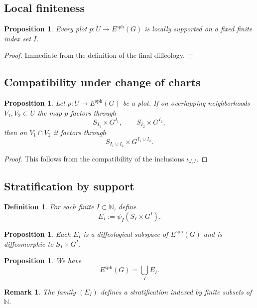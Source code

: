 \documentclass[11pt]{amsart}
\newtheorem{proposition}[theorem]{Proposition}
\newtheorem{definition}[theorem]{Definition}
\newtheorem{remark}[theorem]{Remark}
\begin{document}
\subsection{Local finiteness}

\begin{proposition}
Every plot $p : U \to E^{\mathrm{sph}}(G)$ is locally supported on a fixed finite index set $I$.
\end{proposition}

\begin{proof}
Immediate from the definition of the final diffeology.
\end{proof}

\subsection{Compatibility under change of charts}

\begin{proposition}
Let $p : U \to E^{\mathrm{sph}}(G)$ be a plot. If on overlapping neighborhoods $V_1, V_2 \subset U$ the map $p$ factors through
\[
S_{I_1} \times G^{I_1}, \qquad S_{I_2} \times G^{I_2},
\]
then on $V_1 \cap V_2$ it factors through
\[
S_{I_1 \cup I_2} \times G^{I_1 \cup I_2}.
\]
\end{proposition}

\begin{proof}
This follows from the compatibility of the inclusions $\iota_{J,I}$.
\end{proof}

\subsection{Stratification by support}

\begin{definition}
For each finite $I \subset \mathbb{N}$, define
\[
E_I := \psi_I(S_I \times G^I).
\]
\end{definition}

\begin{proposition}
Each $E_I$ is a diffeological subspace of $E^{\mathrm{sph}}(G)$ and is diffeomorphic to $S_I \times G^I$.
\end{proposition}

\begin{proposition}
We have
\[
E^{\mathrm{sph}}(G) = \bigcup_{I} E_I.
\]
\end{proposition}

\begin{remark}
The family $(E_I)$ defines a stratification indexed by finite subsets of $\mathbb{N}$.
\end{remark}
\end{document}
